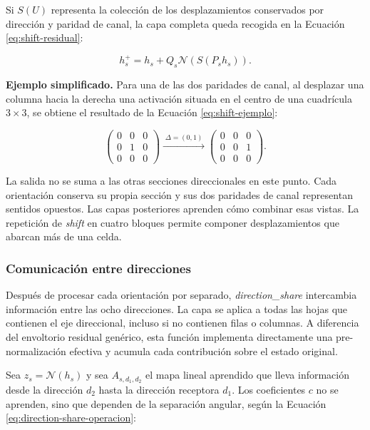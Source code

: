 \documentclass[11pt,a4paper,spanish]{book}
\numberwithin{equation}{chapter}
\numberwithin{figure}{chapter}
\begin{document}
Si \(S(U)\) representa la colección de los desplazamientos conservados por dirección y paridad de canal, la capa completa queda
recogida en la Ecuación \eqref{eq:shift-residual}:

\begin{equation}\label{eq:shift-residual}
h_s^{+}=h_s+Q_s\mathcal{N}\!\left(S(P_s h_s)\right).
\end{equation}

\textbf{Ejemplo simplificado.} Para una de las dos paridades de canal, al desplazar una columna hacia la derecha una activación situada
en el centro de una cuadrícula \(3\times3\), se obtiene el resultado de la Ecuación \eqref{eq:shift-ejemplo}:

\begin{equation}\label{eq:shift-ejemplo}
\begin{pmatrix}
0&0&0\\
0&1&0\\
0&0&0
\end{pmatrix}
\xrightarrow{\;\Delta=(0,1)\;}
\begin{pmatrix}
0&0&0\\
0&0&1\\
0&0&0
\end{pmatrix}.
\end{equation}

La salida no se suma a las otras secciones direccionales en este punto. Cada orientación conserva su propia sección y sus dos paridades
de canal representan sentidos opuestos. Las capas posteriores aprenden cómo combinar esas vistas. La repetición de \textit{shift} en
cuatro bloques permite componer desplazamientos que abarcan más de una celda.

\subsubsection{Comunicación entre direcciones}

Después de procesar cada orientación por separado, \textit{direction\_share} intercambia información entre las ocho direcciones. La
capa se aplica a todas las hojas que contienen el eje direccional, incluso si no contienen filas o columnas. A diferencia del
envoltorio residual genérico, esta función implementa directamente una pre-normalización efectiva y acumula cada contribución sobre
el estado original.

Sea \(z_s=\mathcal{N}(h_s)\) y sea \(A_{s,d_1,d_2}\) el mapa lineal aprendido que lleva información desde la dirección \(d_2\) hasta
la dirección receptora \(d_1\). Los coeficientes \(c\) no se aprenden, sino que dependen de la separación angular, según la Ecuación
\eqref{eq:direction-share-operacion}:
\end{document}
